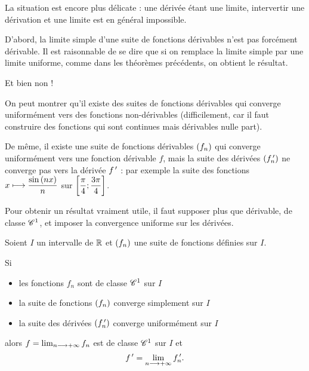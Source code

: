 La situation est encore plus délicate : une dérivée étant une limite, intervertir une dérivation et une limite est en général impossible.

D'abord, la limite simple d'une suite de fonctions dérivables n'est pas forcément dérivable. Il est raisonnable de se dire que si on remplace la limite simple par une limite uniforme, comme dans les théorèmes précédents, on obtient le résultat.

Et bien non !

On peut montrer qu'il existe des suites de fonctions dérivables qui converge uniformément vers des fonctions non-dérivables (difficilement, car il faut construire des fonctions qui sont continues mais dérivables nulle part).

De même, il existe une suite de fonctions dérivables \(\left(f_n\right)\) qui converge uniformément vers une fonction dérivable \(f\), mais la suite des dérivées \(\left(f_n^{\,\prime}\right)\) ne converge pas vers la dérivée \(f^{\,\prime}\) : par exemple la suite des fonctions \(x\longmapsto\dfrac{\sin\left(nx\right)}{n}\) sur \(\left[\dfrac{\pi}{4};\dfrac{3\pi}{4}\right]\).

Pour obtenir un résultat vraiment utile, il faut supposer plus que dérivable, \ie de classe \(\mathscr{C}^{1}\), et imposer la convergence uniforme sur les dérivées.

\begin{theo}
Soient \(I\) un intervalle de \(\mathbb{R}\) et \(\left(f_n\right)\) une suite de fonctions définies sur \(I\).

Si

\begin{itemize}
    \item les fonctions \(f_n\) sont de classe \(\mathscr{C}^{1}\) sur \(I\) \\
    \item la suite de fonctions \(\left(f_n\right)\) converge simplement sur \(I\) \\
    \item la suite des dérivées \(\left(f_n^{\,\prime}\right)\) converge uniformément sur \(I\)
\end{itemize}

alors \(f=\lim_{n\longrightarrow+\infty}f_n\) est de classe \(\mathscr{C}^{1}\) sur \(I\) et \[f^{\,\prime}=\lim_{n\longrightarrow+\infty}f_n^{\,\prime}.\]
\end{theo}

